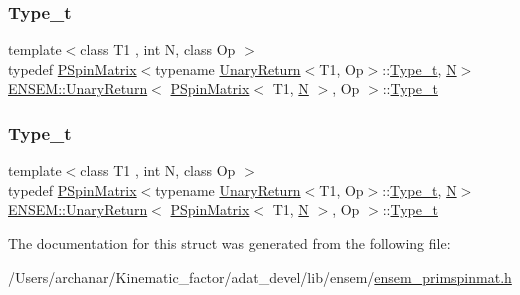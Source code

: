 \subsubsection{\texorpdfstring{Type\_t}{Type\_t}\hspace{0.1cm}{\footnotesize\ttfamily [1/2]}}
{\footnotesize\ttfamily template$<$class T1 , int N, class Op $>$ \\
typedef \mbox{\hyperlink{classENSEM_1_1PSpinMatrix}{P\+Spin\+Matrix}}$<$typename \mbox{\hyperlink{structENSEM_1_1UnaryReturn}{Unary\+Return}}$<$T1, Op$>$\+::\mbox{\hyperlink{structENSEM_1_1UnaryReturn_3_01PSpinMatrix_3_01T1_00_01N_01_4_00_01Op_01_4_a722e6dd982e4f02e3281bc8a3b8f8bfa}{Type\+\_\+t}}, \mbox{\hyperlink{operator__name__util_8cc_a7722c8ecbb62d99aee7ce68b1752f337}{N}}$>$ \mbox{\hyperlink{structENSEM_1_1UnaryReturn}{E\+N\+S\+E\+M\+::\+Unary\+Return}}$<$ \mbox{\hyperlink{classENSEM_1_1PSpinMatrix}{P\+Spin\+Matrix}}$<$ T1, \mbox{\hyperlink{operator__name__util_8cc_a7722c8ecbb62d99aee7ce68b1752f337}{N}} $>$, Op $>$\+::\mbox{\hyperlink{structENSEM_1_1UnaryReturn_3_01PSpinMatrix_3_01T1_00_01N_01_4_00_01Op_01_4_a722e6dd982e4f02e3281bc8a3b8f8bfa}{Type\+\_\+t}}}

\mbox{\label{structENSEM_1_1UnaryReturn_3_01PSpinMatrix_3_01T1_00_01N_01_4_00_01Op_01_4_a722e6dd982e4f02e3281bc8a3b8f8bfa}} 
\subsubsection{\texorpdfstring{Type\_t}{Type\_t}\hspace{0.1cm}{\footnotesize\ttfamily [2/2]}}
{\footnotesize\ttfamily template$<$class T1 , int N, class Op $>$ \\
typedef \mbox{\hyperlink{classENSEM_1_1PSpinMatrix}{P\+Spin\+Matrix}}$<$typename \mbox{\hyperlink{structENSEM_1_1UnaryReturn}{Unary\+Return}}$<$T1, Op$>$\+::\mbox{\hyperlink{structENSEM_1_1UnaryReturn_3_01PSpinMatrix_3_01T1_00_01N_01_4_00_01Op_01_4_a722e6dd982e4f02e3281bc8a3b8f8bfa}{Type\+\_\+t}}, \mbox{\hyperlink{operator__name__util_8cc_a7722c8ecbb62d99aee7ce68b1752f337}{N}}$>$ \mbox{\hyperlink{structENSEM_1_1UnaryReturn}{E\+N\+S\+E\+M\+::\+Unary\+Return}}$<$ \mbox{\hyperlink{classENSEM_1_1PSpinMatrix}{P\+Spin\+Matrix}}$<$ T1, \mbox{\hyperlink{operator__name__util_8cc_a7722c8ecbb62d99aee7ce68b1752f337}{N}} $>$, Op $>$\+::\mbox{\hyperlink{structENSEM_1_1UnaryReturn_3_01PSpinMatrix_3_01T1_00_01N_01_4_00_01Op_01_4_a722e6dd982e4f02e3281bc8a3b8f8bfa}{Type\+\_\+t}}}



The documentation for this struct was generated from the following file\+:\begin{DoxyCompactItemize}
\item 
/\+Users/archanar/\+Kinematic\+\_\+factor/adat\+\_\+devel/lib/ensem/\mbox{\hyperlink{lib_2ensem_2ensem__primspinmat_8h}{ensem\+\_\+primspinmat.\+h}}\end{DoxyCompactItemize}

